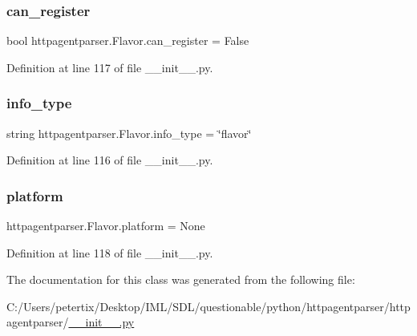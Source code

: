 \subsubsection{\texorpdfstring{can\+\_\+register}{can\_register}}
{\footnotesize\ttfamily bool httpagentparser.\+Flavor.\+can\+\_\+register = False\hspace{0.3cm}{\ttfamily [static]}}



Definition at line 117 of file \+\_\+\+\_\+init\+\_\+\+\_\+.\+py.

\hypertarget{classhttpagentparser_1_1_flavor_a689946dcfbf3f0540b547b44fd421f98}{}\label{classhttpagentparser_1_1_flavor_a689946dcfbf3f0540b547b44fd421f98} 
\subsubsection{\texorpdfstring{info\+\_\+type}{info\_type}}
{\footnotesize\ttfamily string httpagentparser.\+Flavor.\+info\+\_\+type = \char`\"{}flavor\char`\"{}\hspace{0.3cm}{\ttfamily [static]}}



Definition at line 116 of file \+\_\+\+\_\+init\+\_\+\+\_\+.\+py.

\hypertarget{classhttpagentparser_1_1_flavor_a55fb5da39e53fb9cffd01139f2e56e0b}{}\label{classhttpagentparser_1_1_flavor_a55fb5da39e53fb9cffd01139f2e56e0b} 
\subsubsection{\texorpdfstring{platform}{platform}}
{\footnotesize\ttfamily httpagentparser.\+Flavor.\+platform = None\hspace{0.3cm}{\ttfamily [static]}}



Definition at line 118 of file \+\_\+\+\_\+init\+\_\+\+\_\+.\+py.



The documentation for this class was generated from the following file\+:\begin{DoxyCompactItemize}
\item 
C\+:/\+Users/petertix/\+Desktop/\+I\+M\+L/\+S\+D\+L/questionable/python/httpagentparser/httpagentparser/\hyperlink{____init_____8py}{\+\_\+\+\_\+init\+\_\+\+\_\+.\+py}\end{DoxyCompactItemize}
